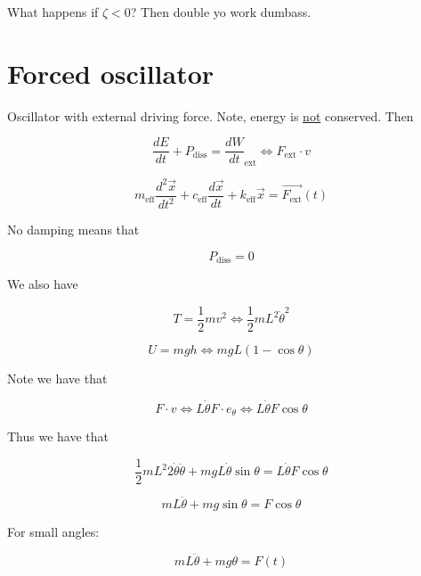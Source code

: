 \documentclass{article}
\newtheorem{one minute paper}[theorem]{One Minute Paper}
\begin{document}
What happens if $\zeta < 0$? Then double yo work dumbass. 

\section*{Forced oscillator}
Oscillator with external driving force. Note, energy is \underline{not} conserved. Then 

\begin{equation}
    \frac{dE}{dt} + P_{\text{diss}} = \frac{dW}{dt}_{\text{ext}} \iff F_{\text{ext}} \cdot v
\end{equation}

\begin{equation}
    m_{\text{eff}}\frac{d^2\vec{x}}{dt^2} + c_{\text{eff}}\frac{d\vec{x}}{dt} + k_{\text{eff}}\vec{x} = \vec{F_{\text{ext}}}(t)
\end{equation}

No damping means that 

\begin{equation}
    P_{\text{diss}} = 0
\end{equation}

We also have 

\begin{equation}
    T = \frac{1}{2}mv^2 \iff \frac{1}{2}mL^2\dot{\theta}^2
\end{equation}

\begin{equation}
    U = mgh \iff mgL(1-\cos\theta)
\end{equation}

Note we have that 

\begin{equation}
    F \cdot v \iff L\dot{\theta}F\cdot e_{\theta} \iff L\dot{\theta}F\cos\theta
\end{equation}

Thus we have that 

\begin{equation}
    \frac{1}{2}mL^2 2\dot{\theta}\ddot{\theta} + mgL\dot{\theta}\sin\theta = L\dot{\theta}F\cos\theta
\end{equation}

\begin{equation}
    mL\ddot{\theta} + mg\sin\theta = F\cos\theta
\end{equation}

For small angles:

\begin{equation}
    mL\ddot{\theta} + mg\theta = F(t)
\end{equation}
\end{document}
